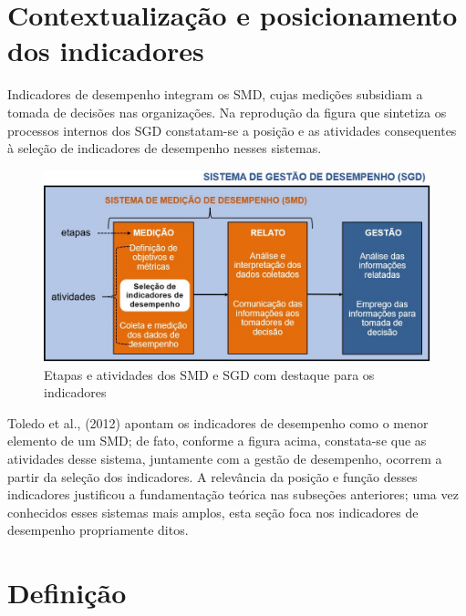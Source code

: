 \documentclass[
  letterpaper,
  DIV=11,
  numbers=noendperiod]{scrreprt}
\begin{document}
\hypertarget{contextualizauxe7uxe3o-e-posicionamento-dos-indicadores}{%
\section{Contextualização e posicionamento dos
indicadores}\label{contextualizauxe7uxe3o-e-posicionamento-dos-indicadores}}

Indicadores de desempenho integram os SMD, cujas medições subsidiam a
tomada de decisões nas organizações. Na reprodução da figura que
sintetiza os processos internos dos SGD constatam-se a posição e as
atividades consequentes à seleção de indicadores de desempenho nesses
sistemas.

\begin{figure}

{\centering \includegraphics{images/SMD_indicadores.JPG}

}

\caption{Etapas e atividades dos SMD e SGD com destaque para os
indicadores}

\end{figure}

Toledo et al., (2012) apontam os indicadores de desempenho como o menor
elemento de um SMD; de fato, conforme a figura acima, constata-se que as
atividades desse sistema, juntamente com a gestão de desempenho, ocorrem
a partir da seleção dos indicadores. A relevância da posição e função
desses indicadores justificou a fundamentação teórica nas subseções
anteriores; uma vez conhecidos esses sistemas mais amplos, esta seção
foca nos indicadores de desempenho propriamente ditos.

\hypertarget{definiuxe7uxe3o}{%
\section{Definição}\label{definiuxe7uxe3o}}
\end{document}
